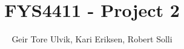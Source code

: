 \documentclass[12pt]{article}
\begin{document}
\title{FYS4411 - Project 2}
\author{Geir Tore Ulvik, Kari Eriksen, Robert Solli}
\maketitle




%



\appendix





\end{document}
